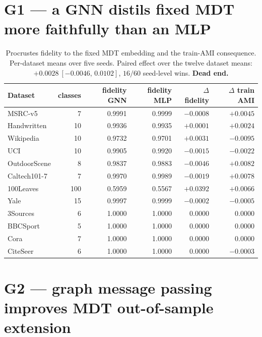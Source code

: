 \documentclass[10pt]{article}
\begin{document}
\section*{G1 --- a GNN distils fixed MDT more faithfully than an MLP}

\begin{table}[h]\centering\footnotesize
\caption{Procrustes fidelity to the fixed MDT embedding and the train-AMI consequence.
Per-dataset means over five seeds. Paired effect over the twelve dataset means:
$+0.0028\ [-0.0046,\, 0.0102]$, $16/60$ seed-level wins. \textbf{Dead end.}}
\begin{tabular}{@{}l r r r r r@{}}
\toprule
Dataset & classes & fidelity GNN & fidelity MLP & $\Delta$ fidelity & $\Delta$ train AMI\\
\midrule
MSRC-v5      & 7   & 0.9991 & 0.9999 & $-0.0008$ & $+0.0045$\\
Handwritten  & 10  & 0.9936 & 0.9935 & $+0.0001$ & $+0.0024$\\
Wikipedia    & 10  & 0.9732 & 0.9701 & $+0.0031$ & $-0.0095$\\
UCI          & 10  & 0.9905 & 0.9920 & $-0.0015$ & $-0.0022$\\
OutdoorScene & 8   & 0.9837 & 0.9883 & $-0.0046$ & $+0.0082$\\
Caltech101-7 & 7   & 0.9970 & 0.9989 & $-0.0019$ & $+0.0078$\\
100Leaves    & 100 & 0.5959 & 0.5567 & $+0.0392$ & $+0.0066$\\
Yale         & 15  & 0.9997 & 0.9999 & $-0.0002$ & $-0.0005$\\
3Sources     & 6   & 1.0000 & 1.0000 & $0.0000$  & $0.0000$\\
BBCSport     & 5   & 1.0000 & 1.0000 & $0.0000$  & $0.0000$\\
Cora         & 7   & 1.0000 & 1.0000 & $0.0000$  & $0.0000$\\
CiteSeer     & 6   & 1.0000 & 1.0000 & $0.0000$  & $-0.0003$\\
\bottomrule
\end{tabular}
\end{table}

\section*{G2 --- graph message passing improves MDT out-of-sample extension}
\end{document}
